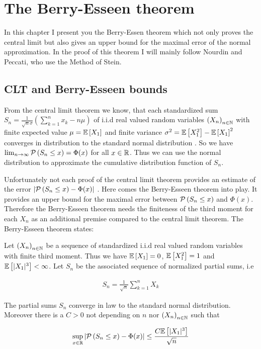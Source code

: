 \chapter{The Berry-Esseen theorem}

In this chapter I present you the Berry-Essen theorem which not only proves the central limit but also gives an upper bound for the maximal error of the normal approximation. In the proof of this theorem I will mainly follow Nourdin and Peccati\cite[p. 71 ff.]{nourdin}, who use the Method of Stein.

\section{CLT and Berry-Esseen bounds}

From the central limit theorem we know, that each standardized sum $S_n = \tfrac 1{\sqrt n\sigma} \left(\sum_{k=1}^n x_k - n\mu\right)$ of i.i.d real valued random variables $\seq{X_n}$ with finite expected value $\mu=\E{X_1}$ and finite variance $\sigma^2=\E{X_1^2}-\E{X_1}^2$ converges in distribution to the standard normal distribution . So we have $\lim_{n\to\infty} \P{S_n\le x} = \Phi(x)$ for all $x\in\R$. Thus we can use the normal distribution to approximate the cumulative distribution function of $S_n$.

Unfortunately not each proof of the central limit theorem provides an estimate of the error $\abs{\P{S_n\le x}-\Phi(x)}$ . Here comes the Berry-Esseen theorem into play. It provides an upper bound for the maximal error between $\P{S_n \le x}$ and $\Phi(x)$. Therefore the Berry-Esseen theorem needs the finiteness of the third moment for each $X_n$ as an additional premise compared to the central limit theorem. The Berry-Esseen theorem states\cite[p. 71]{nourdin}:

\begin{theorem}
  Let $\seq{X_n}$ be a sequence of standardized i.i.d real valued random variables with finite third moment. Thus we have $\E{X_1}=0$, $\E{X_1^2}=1$ and $\E{|X_1|^3} < \infty$. Let $S_n$ be the associated sequence of normalized partial sums, i.e

  \begin{align}
    S_n = \frac{1}{\sqrt n} \sum_{k=1}^n X_k
  \end{align}

  The partial sums $S_n$ converge in law to the standard normal distribution. Moreover there is a $C > 0$ not depending on $n$ nor $\seq{X_n}$ such that

  \begin{align}
    \sup_{x\in\R} \abs{\P{S_n\le x}-\Phi(x)} \le \frac{C \E{|X_1|^3}}{\sqrt n}
  \end{align}
\end{theorem}

